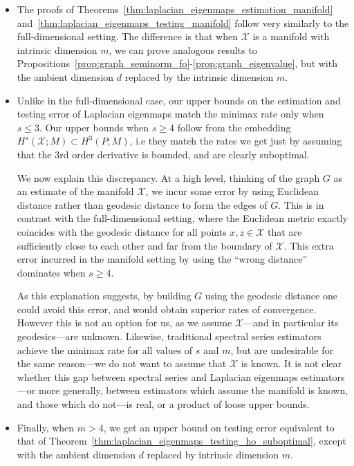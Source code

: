 \documentclass{article}
\newcommand{\1}{\mathbf{1}}
\newcommand{\mc}[1]{\mathcal{#1}}
\theoremstyle{alden}
\theoremstyle{aldenthm}
\theoremstyle{definition}
\theoremstyle{remark}
\begin{document}
\begin{itemize}
	\item The proofs of Theorems~\ref{thm:laplacian_eigenmaps_estimation_manifold} and~\ref{thm:laplacian_eigenmaps_testing_manifold} follow very similarly to the full-dimensional setting. The difference is that when $\mc{X}$ is a manifold with intrinsic dimension $m$, we can prove analogous results to Propositions~\ref{prop:graph_seminorm_fo}-\ref{prop:graph_eigenvalue}, but with the ambient dimension $d$ replaced by the intrinsic dimension $m$. 
	\item Unlike in the full-dimensional case, our upper bounds on the estimation and testing error of Laplacian eigenmaps match the minimax rate only when $s \leq 3$.  Our upper bounds when $s \geq 4$ follow from the embedding $H^s(\mc{X};M) \subset H^{3}(P;M)$, i.e they match the rates we get just by assuming that the $3$rd order derivative is bounded, and are clearly suboptimal.
	
	We now explain this discrepancy. At a high level, thinking of the graph $G$ as an estimate of the manifold $\mc{X}$, we incur some error by using Euclidean distance rather than geodesic distance to form the edges of $G$. This is in contrast with the full-dimensional setting, where the Euclidean metric exactly coincides with the geodesic distance for all points $x,z \in \mc{X}$ that are sufficiently close to each other and far from the boundary of $\mc{X}$. This extra error incurred in the manifold setting by using the ``wrong distance'' dominates when $s \geq 4$. 
	
	As this explanation suggests, by building $G$ using the geodesic distance one could avoid this error, and would obtain superior rates of convergence. However this is not an option for us, as we assume $\mc{X}$---and in particular its geodesics---are unknown. Likewise, traditional spectral series estimators achieve the minimax rate for all values of $s$ and $m$, but are undesirable for the same reason---we do not want to assume that $\mc{X}$ is known. It is not clear whether this gap between spectral series and Laplacian eigenmaps estimators---or more generally, between estimators which assume the manifold is known, and those which do not---is real, or a product of loose upper bounds. 
	
	\item Finally, when $m > 4$, we get an upper bound on testing error equivalent to that of Theorem~\ref{thm:laplacian_eigenmaps_testing_ho_suboptimal}, except with the ambient dimension $d$ replaced by intrinsic dimension $m$.
\end{itemize}
\end{document}
